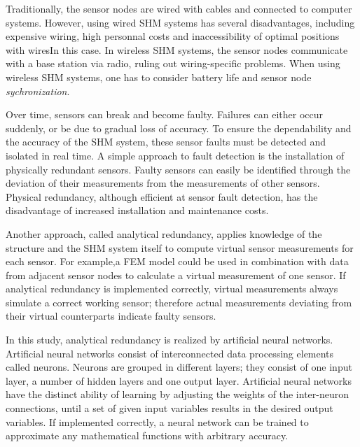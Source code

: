 \documentclass[12pt]{scrartcl}
\begin{document}
Traditionally, the sensor nodes are wired with cables and connected to computer systems.
However, using wired SHM systems has several disadvantages, including expensive wiring, high personnal costs and inaccessibility of optimal positions with wiresIn this case.
In wireless SHM systems, the sensor nodes communicate with a base station via radio, ruling out wiring-specific problems.
When using wireless SHM systems, one has to consider battery life and sensor node \textit{sychronization}.

Over time, sensors can break and become faulty. Failures can either occur suddenly, or be due to gradual loss of accuracy.
To ensure the dependability and the accuracy of the SHM system, these sensor faults must be detected and isolated in real time. 
A simple approach to fault detection is the installation of physically redundant sensors.
Faulty sensors can easily be identified through the deviation of their measurements from the measurements of other sensors.
Physical redundancy, although efficient at sensor fault detection, has the disadvantage of increased installation and maintenance costs. \cite{SmarslyDA}

Another approach, called analytical redundancy, applies knowledge of the structure and the SHM system itself to compute virtual sensor measurements for each sensor.
For example,a FEM model could be used in combination with data from adjacent sensor nodes to calculate a virtual measurement of one sensor.
If analytical redundancy is implemented correctly, virtual measurements always simulate a correct working sensor; therefore actual measurements deviating from their virtual counterparts indicate faulty sensors.\cite{SmarslyDA} 

In this study, analytical redundancy is realized by artificial neural networks.
Artificial neural networks consist of interconnected data processing elements called neurons. 
Neurons are grouped in different layers; they consist of one input layer, a number of hidden layers and one output layer.
Artificial neural networks have the distinct ability of learning by adjusting the weights of the inter-neuron connections, until a set of given input variables results in the desired output variables.
If implemented correctly, a neural network can be trained to approximate any mathematical functions with arbitrary accuracy.
\end{document}
